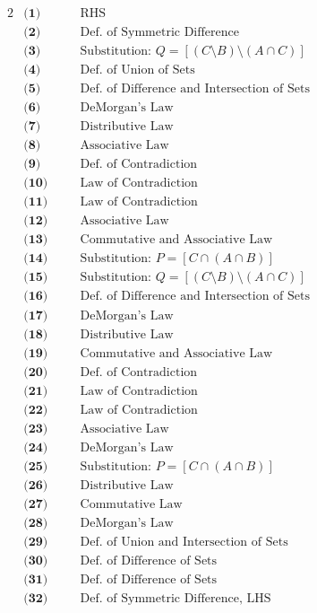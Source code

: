 \begin{alignat*}{2}
&\textbf{(1)} && \quad \text{RHS} \\
&\textbf{(2)} && \quad \text{Def. of Symmetric Difference} \\
&\textbf{(3)} && \quad \text{Substitution: } Q = [(C \setminus B) \setminus (A \cap C)] \\
&\textbf{(4)} && \quad \text{Def. of Union of Sets} \\
&\textbf{(5)} && \quad \text{Def. of Difference and Intersection of Sets} \\
&\textbf{(6)} && \quad \text{DeMorgan's Law} \\
&\textbf{(7)} && \quad \text{Distributive Law} \\
&\textbf{(8)} && \quad \text{Associative Law} \\
&\textbf{(9)} && \quad \text{Def. of Contradiction} \\
&\textbf{(10)} && \quad \text{Law of Contradiction} \\
&\textbf{(11)} && \quad \text{Law of Contradiction} \\
&\textbf{(12)} && \quad \text{Associative Law} \\
&\textbf{(13)} && \quad \text{Commutative and Associative Law} \\
&\textbf{(14)} && \quad \text{Substitution: } P = [C \cap (A \cap B)] \\
&\textbf{(15)} && \quad \text{Substitution: } Q = [(C \setminus B) \setminus (A \cap C)] \\
&\textbf{(16)} && \quad \text{Def. of Difference and Intersection of Sets} \\
&\textbf{(17)} && \quad \text{DeMorgan's Law} \\
&\textbf{(18)} && \quad \text{Distributive Law} \\
&\textbf{(19)} && \quad \text{Commutative and Associative Law} \\
&\textbf{(20)} && \quad \text{Def. of Contradiction} \\
&\textbf{(21)} && \quad \text{Law of Contradiction} \\
&\textbf{(22)} && \quad \text{Law of Contradiction} \\
&\textbf{(23)} && \quad \text{Associative Law} \\
&\textbf{(24)} && \quad \text{DeMorgan's Law} \\
&\textbf{(25)} && \quad \text{Substitution: } P = [C \cap (A \cap B)] \\
&\textbf{(26)} && \quad \text{Distributive Law} \\
&\textbf{(27)} && \quad \text{Commutative Law} \\
&\textbf{(28)} && \quad \text{DeMorgan's Law} \\
&\textbf{(29)} && \quad \text{Def. of Union and Intersection of Sets} \\
&\textbf{(30)} && \quad \text{Def. of Difference of Sets} \\
&\textbf{(31)} && \quad \text{Def. of Difference of Sets} \\
&\textbf{(32)} && \quad \text{Def. of Symmetric Difference, LHS} \\
\end{alignat*}
\pagebreak

